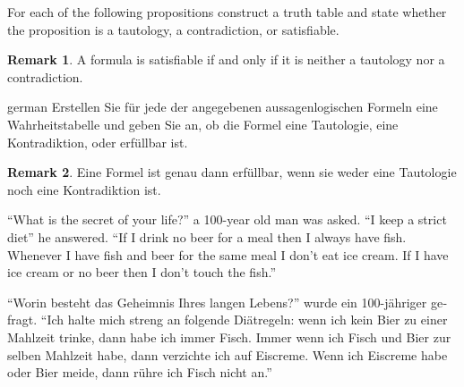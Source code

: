 \documentclass[a4paper,11pt]{exam}
\theoremstyle{definition}
\newtheorem{remark}{Remark}
\begin{document}

\begin{center} 
\end{center}


\newtheorem{theorem}{Theorem}
\theoremstyle{definition}
\newtheorem{example}{Example}

\begin{questions}

For each of the following propositions construct a truth table and state whether the proposition is a tautology, a contradiction, or satisfiable.

\begin{remark}
	A formula is satisfiable if and only if it is neither a tautology nor a contradiction.
\end{remark}

\begin{otherlanguage*}{german}
	Erstellen Sie für jede der angegebenen aussagenlogischen Formeln eine Wahrheitstabelle und geben Sie an, ob die Formel eine Tautologie, eine Kontradiktion, oder erfüllbar ist.

	\begin{remark}
		Eine Formel ist genau dann erfüllbar, wenn sie weder eine Tautologie noch eine Kontradiktion ist.
	\end{remark}
\end{otherlanguage*}


``What is the secret of your life?'' a 100-year old man was asked. ``I keep a strict diet'' he answered. ``If I drink no beer for a meal then I always have fish. Whenever I have fish and beer for the same meal I don't eat ice cream. If I have ice cream or no beer then I don't touch the fish.''

\begin{otherlanguage}{german}
``Worin besteht das Geheimnis Ihres langen Lebens?'' wurde ein 100-jähriger gefragt. ``Ich halte mich streng an folgende Diätregeln: wenn ich kein Bier zu einer Mahlzeit trinke, dann habe ich immer Fisch. Immer wenn ich Fisch und Bier zur selben Mahlzeit habe, dann verzichte ich auf Eiscreme. Wenn ich Eiscreme habe oder Bier meide, dann rühre ich Fisch nicht an.''
\end{otherlanguage}


\end{questions}
\end{document}
